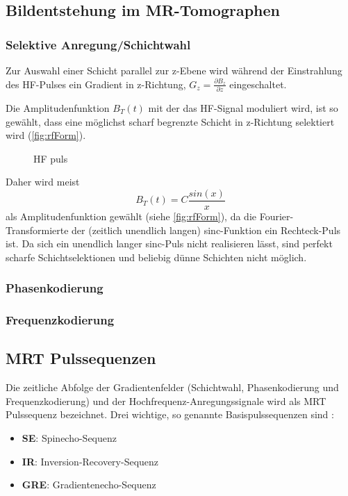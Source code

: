 \subsection{Bildentstehung im MR-Tomographen}

\subsubsection{Selektive Anregung/Schichtwahl}
Zur Auswahl einer Schicht parallel zur z-Ebene wird während der Einstrahlung des HF-Pulses ein Gradient in z-Richtung, $G_z=\frac{\partial B_z}{\partial z}$ eingeschaltet.

Die Amplitudenfunktion $B_T(t)$ mit der das HF-Signal moduliert wird, ist so gewählt, dass eine möglichst scharf begrenzte Schicht in z-Richtung selektiert wird (\autoref{fig:rfForm}).

\begin{figure}[H]
	\centering
	\caption[form]{HF puls}
	\label{fig:rfForm}
\end{figure}

Daher wird meist
\begin{equation}
	B_T(t)=C \frac{sin(x)}{x}
\end{equation}
als Amplitudenfunktion gewählt (siehe \autoref{fig:rfForm}), da die Fourier-Transformierte der (zeitlich unendlich langen) sinc-Funktion ein Rechteck-Puls ist. Da sich ein unendlich langer sinc-Puls nicht realisieren lässt, sind perfekt scharfe Schichtselektionen und beliebig dünne Schichten nicht möglich.

\subsubsection{Phasenkodierung}

\subsubsection{Frequenzkodierung}

\subsection{MRT Pulssequenzen}
Die zeitliche Abfolge der Gradientenfelder (Schichtwahl, Phasenkodierung und Frequenzkodierung) und der Hochfrequenz-Anregungssignale wird als MRT Pulssequenz bezeichnet.
Drei wichtige, so genannte Basispulssequenzen sind \cite[S. 999]{Weishaupt2014}:
\begin{itemize}
	\item \textbf{SE}: Spinecho-Sequenz
	\item \textbf{IR}: Inversion-Recovery-Sequenz
	\item \textbf{GRE}: Gradientenecho-Sequenz
\end{itemize}

